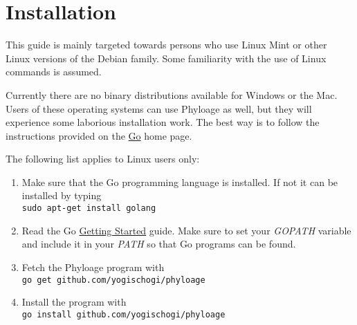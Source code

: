 \section{Installation}

This guide is mainly targeted towards persons who use Linux Mint
or other Linux versions of the Debian family. Some familiarity
with the use of Linux commands is assumed.

Currently there are no binary distributions available for
Windows or the Mac. Users of these operating systems can
use Phyloage as well, but they will experience some
laborious installation work. The best way is to follow the
instructions provided on the
\href{http://golang.org/}{Go} home page.

The following list applies to Linux users only:

\begin{enumerate}
\item Make sure that the Go programming language is installed.
	If not it can be installed by typing\\
	\texttt{sudo apt-get install golang}
\item Read the Go
	\href{http://golang.org/doc/install}{Getting Started}
	guide. Make sure to set your \emph{GOPATH} variable and
	include it in your \emph{PATH} so that Go programs can be
	found.
\item Fetch the Phyloage program with\\
	\texttt{go get github.com/yogischogi/phyloage}
\item Install the program with\\
	 \texttt{go install github.com/yogischogi/phyloage}
\end{enumerate}

